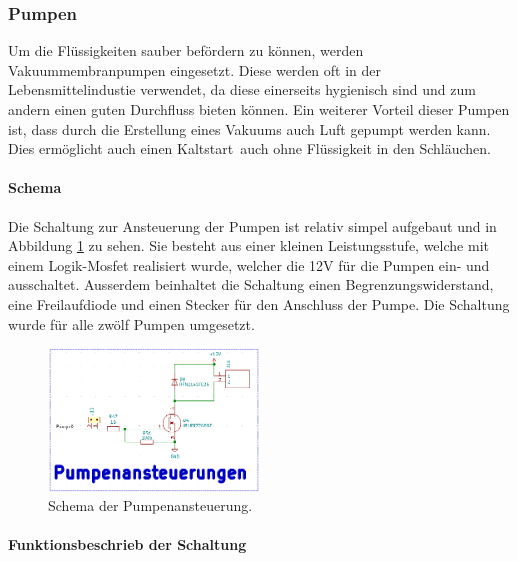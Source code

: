 \subsubsection{Pumpen}
\label{subsubsec:Pumpen}

Um die Flüssigkeiten sauber befördern zu können, werden Vakuummembranpumpen eingesetzt. Diese werden oft in der Lebensmittelindustie verwendet, da diese einerseits hygienisch sind und zum andern einen guten Durchfluss bieten können. Ein weiterer Vorteil dieser Pumpen ist, dass durch die Erstellung eines Vakuums auch Luft gepumpt werden kann. Dies ermöglicht auch einen \flqq Kaltstart\frqq\ auch ohne Flüssigkeit in den Schläuchen. \cite{aiyimaindustrial_store_us_nodate}

\paragraph{Schema}\mbox{}

Die Schaltung zur Ansteuerung der Pumpen ist relativ simpel aufgebaut und in Abbildung \ref{fig:Schema_Pumpenansteuerung} zu sehen. Sie besteht aus einer kleinen Leistungsstufe, welche mit einem Logik-Mosfet realisiert wurde, welcher die 12V für die Pumpen  ein- und ausschaltet. Ausserdem beinhaltet die Schaltung einen Begrenzungswiderstand, eine Freilaufdiode und einen Stecker für den Anschluss der Pumpe. Die Schaltung wurde für alle zwölf Pumpen umgesetzt. \cite{aiyimaindustrial_store_us_nodate}

\begin{figure}[h!]
	\centering
	\includegraphics[width=0.5\textwidth]{graphics/Schema_Pumpenansteuerung.png}
	\caption{Schema der Pumpenansteuerung.}
	\label{fig:Schema_Pumpenansteuerung}
\end{figure}

\paragraph{Funktionsbeschrieb der Schaltung}\mbox{}

